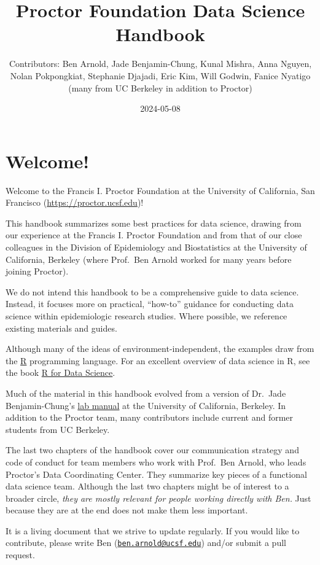 \documentclass[
]{book}
\title{Proctor Foundation Data Science Handbook}
\author{Contributors: Ben Arnold, Jade Benjamin-Chung, Kunal Mishra, Anna Nguyen, Nolan Pokpongkiat, Stephanie Djajadi, Eric Kim, Will Godwin, Fanice Nyatigo (many from UC Berkeley in addition to Proctor)}
\date{2024-05-08}
\begin{document}
\maketitle

{
\setcounter{tocdepth}{1}
\tableofcontents
}
\chapter*{Welcome!}\label{welcome}

Welcome to the Francis I. Proctor Foundation at the University of California, San Francisco (\url{https://proctor.ucsf.edu})!

This handbook summarizes some best practices for data science, drawing from our experience at the Francis I. Proctor Foundation and from that of our close colleagues in the Division of Epidemiology and Biostatistics at the University of California, Berkeley (where Prof.~Ben Arnold worked for many years before joining Proctor).

We do not intend this handbook to be a comprehensive guide to data science. Instead, it focuses more on practical, ``how-to'' guidance for conducting data science within epidemiologic research studies. Where possible, we reference existing materials and guides.

Although many of the ideas of environment-independent, the examples draw from the \href{https://cran.r-project.org/}{R} programming language. For an excellent overview of data science in R, see the book \href{https://r4ds.had.co.nz/}{R for Data Science}.

Much of the material in this handbook evolved from a version of Dr.~Jade Benjamin-Chung's \href{https://github.com/jadebc-berkeley/lab-manual}{lab manual} at the University of California, Berkeley. In addition to the Proctor team, many contributors include current and former students from UC Berkeley.

The last two chapters of the handbook cover our communication strategy and code of conduct for team members who work with Prof.~Ben Arnold, who leads Proctor's Data Coordinating Center. They summarize key pieces of a functional data science team. Although the last two chapters might be of interest to a broader circle, \emph{they are mostly relevant for people working directly with Ben.} Just because they are at the end does not make them less important.

It is a living document that we strive to update regularly. If you would like to contribute, please write Ben (\href{mailto:ben.arnold@ucsf.edu}{\nolinkurl{ben.arnold@ucsf.edu}}) and/or submit a pull request.
\end{document}
